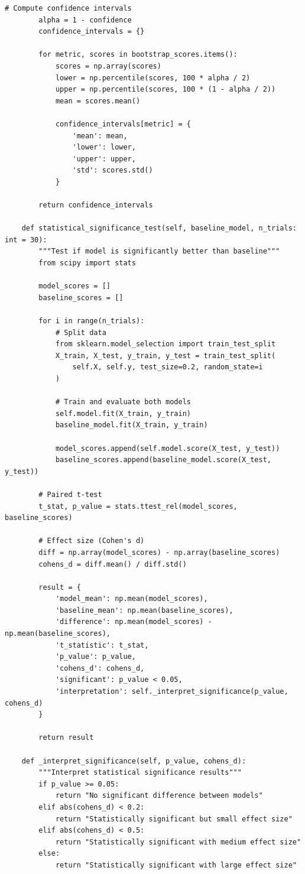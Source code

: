 \begin{lstlisting}[style=python, caption=Comprehensive model validation framework]
        # Compute confidence intervals
        alpha = 1 - confidence
        confidence_intervals = {}

        for metric, scores in bootstrap_scores.items():
            scores = np.array(scores)
            lower = np.percentile(scores, 100 * alpha / 2)
            upper = np.percentile(scores, 100 * (1 - alpha / 2))
            mean = scores.mean()

            confidence_intervals[metric] = {
                'mean': mean,
                'lower': lower,
                'upper': upper,
                'std': scores.std()
            }

        return confidence_intervals

    def statistical_significance_test(self, baseline_model, n_trials: int = 30):
        """Test if model is significantly better than baseline"""
        from scipy import stats

        model_scores = []
        baseline_scores = []

        for i in range(n_trials):
            # Split data
            from sklearn.model_selection import train_test_split
            X_train, X_test, y_train, y_test = train_test_split(
                self.X, self.y, test_size=0.2, random_state=i
            )

            # Train and evaluate both models
            self.model.fit(X_train, y_train)
            baseline_model.fit(X_train, y_train)

            model_scores.append(self.model.score(X_test, y_test))
            baseline_scores.append(baseline_model.score(X_test, y_test))

        # Paired t-test
        t_stat, p_value = stats.ttest_rel(model_scores, baseline_scores)

        # Effect size (Cohen's d)
        diff = np.array(model_scores) - np.array(baseline_scores)
        cohens_d = diff.mean() / diff.std()

        result = {
            'model_mean': np.mean(model_scores),
            'baseline_mean': np.mean(baseline_scores),
            'difference': np.mean(model_scores) - np.mean(baseline_scores),
            't_statistic': t_stat,
            'p_value': p_value,
            'cohens_d': cohens_d,
            'significant': p_value < 0.05,
            'interpretation': self._interpret_significance(p_value, cohens_d)
        }

        return result

    def _interpret_significance(self, p_value, cohens_d):
        """Interpret statistical significance results"""
        if p_value >= 0.05:
            return "No significant difference between models"
        elif abs(cohens_d) < 0.2:
            return "Statistically significant but small effect size"
        elif abs(cohens_d) < 0.5:
            return "Statistically significant with medium effect size"
        else:
            return "Statistically significant with large effect size"


\end{lstlisting}
